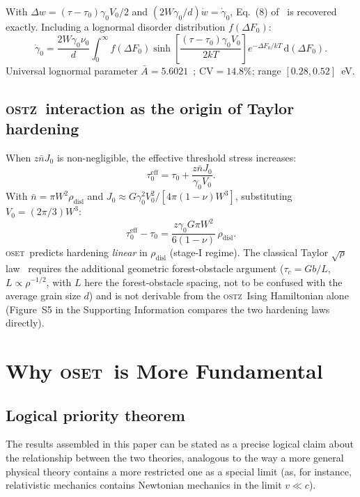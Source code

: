 \documentclass[3p]{elsarticle}
\newcommand{\OSTZ}{\textsc{ostz}}
\newcommand{\OSET}{\textsc{oset}}
\newcommand{\dF}{\Delta F_0}
\newcommand{\gz}{\gamma_0}
\begin{document}
With $\Delta w=(\tau-\tau_0)\gz V_0/2$ and $(2W\gz/d)\dot w=\dot\gz$,
Eq.~(8) of~\citep{pad-part1} is recovered exactly.
Including a lognormal disorder distribution $f(\dF)$:
\begin{equation}
  \dot\gz=\frac{2W\gz\nu_0}{d}\int_0^\infty f(\dF)
  \sinh\!\left[\frac{(\tau-\tau_0)\gz V_0}{2kT}\right]
  e^{-\dF/kT}\,\mathrm d(\dF).
  \label{eq:rateDisorder}
\end{equation}
Universal lognormal parameter $\bar A=5.6021$~\citep{venkatesh-part4};
CV$=14.8\%$; range $[0.28,0.52]$~eV.

\subsection{\OSTZ\ interaction as the origin of Taylor hardening}
\label{sec:taylor}

When $z\bar nJ_0$ is non-negligible, the effective threshold
stress increases:
\begin{equation}
  \tau_0^\text{eff}=\tau_0+\frac{z\bar nJ_0}{\gz V_0}.
  \label{eq:tau0eff}
\end{equation}
With $\bar n=\pi W^2\rho_\text{disl}$ and
$J_0\approx G\gz^2V_0^2/[4\pi(1-\nu)W^3]$,
substituting $V_0=(2\pi/3)W^3$:
\begin{equation}
  \tau_0^\text{eff}-\tau_0=
  \frac{z\gz G\pi W^2}{6(1-\nu)}\,\rho_\text{disl}.
  \label{eq:Taylorhardening}
\end{equation}
\OSET\ predicts hardening \emph{linear} in $\rho_\text{disl}$
(stage-I regime). The classical Taylor $\sqrt\rho$ law~\citep{taylor1934} requires
the additional geometric forest-obstacle argument
($\tau_c=Gb/L$, $L\propto\rho^{-1/2}$, with $L$ here the
forest-obstacle spacing, not to be confused with the average grain
size $d$) and is not derivable
from the \OSTZ\ Ising Hamiltonian alone (Figure~S5 in the Supporting
Information compares the two hardening laws directly).

\section{Why \OSET\ is More Fundamental}
\label{sec:fundamental}

\subsection{Logical priority theorem}

The results assembled in this paper can be stated as a precise
logical claim about the relationship between the two theories,
analogous to the way a more general physical theory contains a more
restricted one as a special limit (as, for instance, relativistic
mechanics contains Newtonian mechanics in the limit $v\ll c$).
\end{document}
